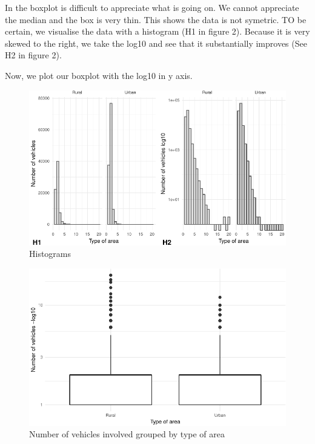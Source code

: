 \documentclass[]{article}
\begin{document}
In the boxplot is difficult to appreciate what is going on. We cannot
appreciate the median and the box is very thin. This shows the data is
not symetric. TO be certain, we visualise the data with a histogram (H1
in figure 2). Because it is very skewed to the right, we take the log10
and see that it substantially improves (See H2 in figure 2).

Now, we plot our boxplot with the log10 in y axis.

\begin{figure}[H]

{\centering \includegraphics{READMEv3_files/figure-latex/fig-1} 

}

\caption{Histograms}\label{fig:fig}
\end{figure}

\begin{figure}[H]

{\centering \includegraphics{READMEv3_files/figure-latex/fig2-1} 

}

\caption{Number of vehicles involved grouped by type of area}\label{fig:fig2}
\end{figure}
\end{document}
